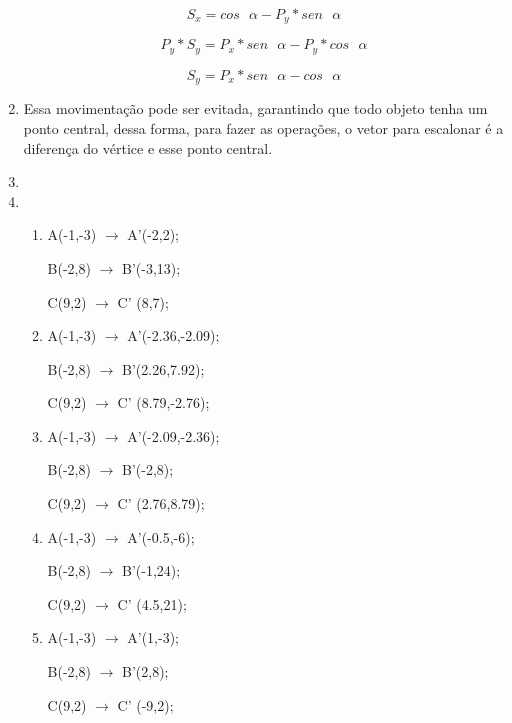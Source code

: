 \begin{enumerate}[label=\arabic*)]
	\begin{equation*}
		S_x = cos \text{ } \alpha - P_y * sen \text{ } \alpha
	\end{equation*}
	
	\begin{equation}
		P_y * S_y = P_x * sen \text{ } \alpha - P_y * cos \text{ } \alpha
	\end{equation}
	
	\begin{equation*}
		S_y = P_x * sen \text{ } \alpha - cos \text{ } \alpha
	\end{equation*}
		\item 
		Essa  movimentação pode ser evitada, garantindo que todo objeto tenha um 
		ponto central, dessa forma, para fazer as operações, o vetor para escalonar é a diferença do
		vértice e esse ponto central.
		\item 

		\item 
				
				\begin{enumerate}[label=\alph*.]
				   \setlength\itemsep{1em}
					\item					
					   				
					   				A(-1,-3) $\rightarrow$ A'(-2,2);
				
									B(-2,8)  $\rightarrow$ B'(-3,13);
				
									C(9,2)  $\rightarrow$ C' (8,7);
					\item 
					
								    A(-1,-3) $\rightarrow$ A'(-2.36,-2.09);
				
									B(-2,8)  $\rightarrow$ B'(2.26,7.92);
				
									C(9,2)  $\rightarrow$ C' (8.79,-2.76);
					\item 
					
									A(-1,-3) $\rightarrow$ A'(-2.09,-2.36);
				
									B(-2,8)  $\rightarrow$ B'(-2,8);
				
									C(9,2)  $\rightarrow$ C' (2.76,8.79);
					\item
					
									A(-1,-3) $\rightarrow$ A'(-0.5,-6);
				
									B(-2,8)  $\rightarrow$ B'(-1,24);
				
									C(9,2)  $\rightarrow$ C' (4.5,21);
					\item
									
									A(-1,-3) $\rightarrow$ A'(1,-3);
				
									B(-2,8)  $\rightarrow$ B'(2,8);
				
									C(9,2)  $\rightarrow$ C' (-9,2);
								
				\end{enumerate}

	\end{enumerate}
	
